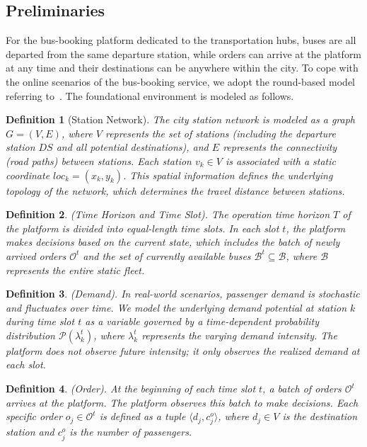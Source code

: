 \documentclass[lettersize,journal]{IEEEtran}
\newtheorem{definition}{Definition}
\begin{document}
\subsection{Preliminaries}
\label{sec:pre}

For the bus-booking platform dedicated to the transportation hubs, buses are all departed from the same departure station, while orders can arrive at the platform at any time and their destinations can be anywhere within the city. To cope with the online scenarios of the bus-booking service, we adopt the round-based model referring to~\cite{ref_order_Zheng}. The foundational environment is modeled as follows.

\begin{definition}[Station Network]
The city station network is modeled as a graph $G=(V, E)$, where $V$ represents the set of stations (including the departure station $DS$ and all potential destinations), and $E$ represents the connectivity (road paths) between stations. Each station $v_k \in V$ is associated with a static coordinate $loc_k = (x_k, y_k)$. This spatial information defines the underlying topology of the network, which determines the travel distance between stations.
\end{definition}

\begin{definition}
(Time Horizon and Time Slot).
The operation time horizon $T$ of the platform is divided into equal-length time slots. In each slot $t$, the platform makes decisions based on the current state, which includes the batch of newly arrived orders $\mathcal{O}^t$ and the set of currently available buses $\mathcal{B}^t \subseteq \mathcal{B}$, where $\mathcal{B}$ represents the entire static fleet.
\end{definition}

\begin{definition}
(Demand).
In real-world scenarios, passenger demand is stochastic and fluctuates over time. We model the underlying demand potential at station $k$ during time slot $t$ as a variable governed by a time-dependent probability distribution $\mathcal{P}(\lambda^t_k)$, where $\lambda^t_k$ represents the varying demand intensity. The platform does not observe future intensity; it only observes the realized demand at each slot.
\end{definition}

\begin{definition}
(Order).
At the beginning of each time slot $t$, a batch of orders $\mathcal{O}^t$ arrives at the platform. The platform observes this batch to make decisions. Each specific order $o_j \in \mathcal{O}^t$ is defined as a tuple $\langle d_j, c_j^o \rangle$, where $d_j \in V$ is the destination station and $c^o_j$ is the number of passengers.
\end{definition}
\end{document}
